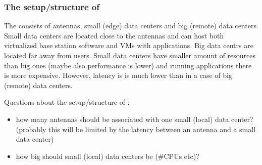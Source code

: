 \subsubsection{The setup/structure of \xcloud}
The \xcloud consists of antennas, small (edge) data centers and big (remote) data centers.
Small data centers are located close to the antennas and can host both virtualized base station software and VMs with applications.
Big data centrs are located far away from users.
Small data centers have smaller amount of resources than big ones (maybe also performance is lower) and running applications there is more expensive.
However, latency is is much lower than in a case of big (remote) data centers.

Questions about the setup/structure of \xcloud:
\begin{itemize}
\item how many antennas should be associated with one small (local) data center? (probably this will be limited by the latency between an antenna and a small data center)
\item how big should small (local) data centers be (\#CPUs etc)?
\end{itemize}